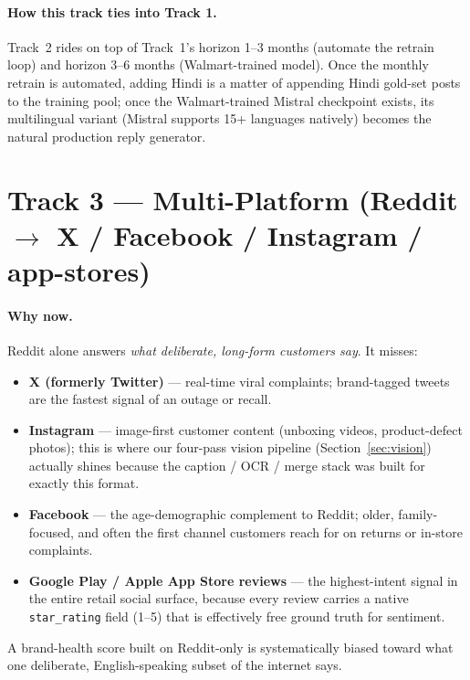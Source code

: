 \paragraph{How this track ties into Track 1.}
Track~2 rides on top of Track~1's horizon 1--3 months (automate
the retrain loop) and horizon 3--6 months (Walmart-trained model).
Once the monthly retrain is automated, adding Hindi is a matter of
appending Hindi gold-set posts to the training pool; once the
Walmart-trained Mistral checkpoint exists, its multilingual variant
(Mistral supports 15+ languages natively) becomes the natural
production reply generator.

\section{Track 3 --- Multi-Platform (Reddit $\to$ X / Facebook / Instagram / app-stores)}\label{sec:future:multiplatform}

\paragraph{Why now.}
Reddit alone answers \emph{what deliberate, long-form customers say}.
It misses:
\begin{itemize}
\item \textbf{X (formerly Twitter)} --- real-time viral complaints;
      brand-tagged tweets are the fastest signal of an outage or
      recall.
\item \textbf{Instagram} --- image-first customer content
      (unboxing videos, product-defect photos); this is where our
      four-pass vision pipeline (Section~\ref{sec:vision}) actually
      shines because the caption / OCR / merge stack was built for
      exactly this format.
\item \textbf{Facebook} --- the age-demographic complement to
      Reddit; older, family-focused, and often the first channel
      customers reach for on returns or in-store complaints.
\item \textbf{Google Play / Apple App Store reviews} --- the
      highest-intent signal in the entire retail social surface,
      because every review carries a native
      \texttt{star\_rating} field (1--5) that is effectively free
      ground truth for sentiment.
\end{itemize}
A brand-health score built on Reddit-only is systematically biased
toward what one deliberate, English-speaking subset of the internet
says.

